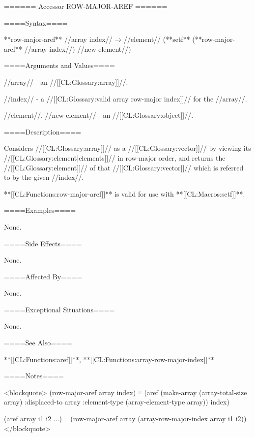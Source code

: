 ====== Accessor ROW-MAJOR-AREF ======

====Syntax====

**row-major-aref** //array index// → //element// (**setf** (**row-major-aref** //array index//) //new-element//)

====Arguments and Values====

//array// - an //[[CL:Glossary:array]]//.

//index// - a //[[CL:Glossary:valid array row-major index]]// for the //array//.

//element//, //new-element// - an //[[CL:Glossary:object]]//.

====Description====

Considers //[[CL:Glossary:array]]// as a //[[CL:Glossary:vector]]// by viewing its //[[CL:Glossary:element|elements]]// in row-major order, and returns the //[[CL:Glossary:element]]// of that //[[CL:Glossary:vector]]// which is referred to by the given //index//.

**[[CL:Functions:row-major-aref]]** is valid for use with **[[CL:Macros:setf]]**.

====Examples====

None.

====Side Effects====

None.

====Affected By====

None.

====Exceptional Situations====

None.

====See Also====

**[[CL:Functions:aref]]**, **[[CL:Functions:array-row-major-index]]**

====Notes====

<blockquote> (row-major-aref array index) ≡ (aref (make-array (array-total-size array) :displaced-to array :element-type (array-element-type array)) index)

(aref array i1 i2 ...) ≡ (row-major-aref array (array-row-major-index array i1 i2)) </blockquote>

 
